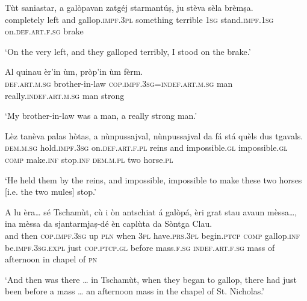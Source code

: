 \begin{linenumbers}
\gll  Tùt saniastar, a galòpavan zatgéj starmantúṣ, ju stèva sèla brèmṣa.  \\
 completely left and gallop.\textsc{impf.3pl} something terrible \textsc{1sg} stand.\textsc{impf.1sg} on.\textsc{def.art.f.sg} brake  \\
\end{linenumbers}
\medskip
\glt `On the very left, and they galloped terribly, I stood on the brake.'
\medskip

\begin{linenumbers}
\gll   Al quinau èr’in ùm, pròp’in ùm fèrm. \\
 \textsc{def.art.m.sg} brother-in-law \textsc{cop.impf.3sg=indef.art.m.sg} man really.\textsc{indef.art.m.sg} man strong  \\
\end{linenumbers}
\medskip
\glt `My brother-in-law was a man, a really strong man.'
\medskip

\begin{linenumbers}
\gll  Lèz tanèva palas hòtas, a nùnpussajval, nùnpussajval da fá stá quèls dus tgavals.  \\
 \textsc{dem.m.sg} hold.\textsc{impf.3sg} on.\textsc{def.art.f.pl} reins and  impossible.\textsc{gl} impossible.\textsc{gl} \textsc{comp} make.\textsc{inf} stop.\textsc{inf}  \textsc{dem.m.pl} two horse.\textsc{pl} \\
\end{linenumbers}
\medskip
\glt `He held them by the reins, and impossible, impossible to make these two horses [i.e. the two mules] stop.'
\medskip

\begin{linenumbers}
\gll  A lu èra… sé Tschamùt, cù i òn antschiat á galòpá, èri grat stau avaun mèssa…, ina mèssa da sjantarmjaṣ-dé èn caplùta da Sòntga Clau.\\
and then \textsc{cop.impf.3sg} up \textsc{pln} when \textsc{3pl} have.\textsc{prs.3pl}  begin.\textsc{ptcp} \textsc{comp} gallop.\textsc{inf} be.\textsc{impf.3sg.expl} just  \textsc{cop.ptcp.gl} before mass.\textsc{f.sg} \textsc{indef.art.f.sg} mass of afternoon in chapel of  \textsc{pn}  \\
\end{linenumbers}
\medskip
\glt `And then was there … in Tschamùt, when they began to gallop, there had just been before a mass … an afternoon mass in the chapel of St. Nicholas.'
\medskip

